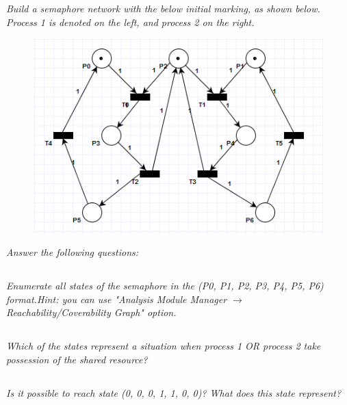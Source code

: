 \documentclass[letterpaper]{article}
\begin{document}
\textit{Build a semaphore network with the below initial marking, as shown below. Process 1 is denoted on the left, and process 2 on the right.
}
\begin{figure}[H]
 \centering
 \includegraphics[width=\textwidth]{image3.png}
\end{figure}

\textit{Answer the following questions:}

\subsection{}
\textit{Enumerate all states of the semaphore in the (P0, P1, P2, P3, P4, P5, P6) format.Hint: you can use "Analysis Module Manager $\rightarrow$ Reachability/Coverability Graph" option.
}
\subsection{}
\textit{Which of the states represent a situation when process 1 OR process 2 take possession of the shared resource?}

\subsection{}
\textit{Is it possible to reach state (0, 0, 0, 1, 1, 0, 0)? What does this state represent?}

\section{}
\end{document}
